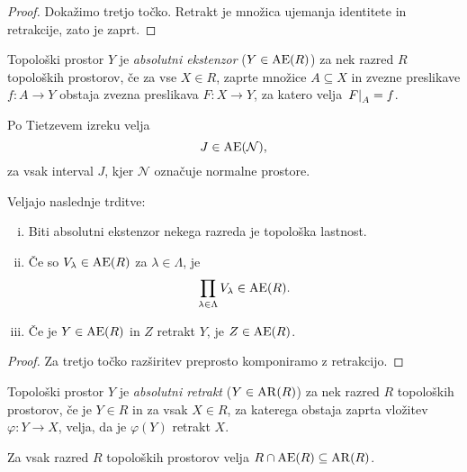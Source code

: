\begin{proof}
Dokažimo tretjo točko. Retrakt je množica ujemanja identitete in
retrakcije, zato je zaprt.
\end{proof}


\begin{definicija}
Topološki prostor $Y$ je
\emph{absolutni ekstenzor}
($Y \in \operatorname{AE}(R)$) za nek razred $R$ topoloških prostorov, če za vse
$X \in R$, zaprte množice $A \subseteq X$ in zvezne preslikave
$f \colon A \to Y$ obstaja zvezna preslikava $F \colon X \to Y$,
za katero velja $\left. F\right|_{A}^{} = f$.
\end{definicija}

\begin{opomba}
Po Tietzevem izreku velja
\[
J \in \operatorname{AE}(\mathcal{N}),
\]
za vsak interval $J$, kjer $\mathcal{N}$ označuje normalne
prostore.
\end{opomba}

\begin{trditev}
Veljajo naslednje trditve:

\begin{enumerate}[i)]
\item Biti absolutni ekstenzor nekega razreda je topološka
lastnost.
\item Če so $V_\lambda \in \operatorname{AE}(R)$ za $\lambda \in \Lambda$, je
\[
\prod_{\lambda \in \Lambda} V_\lambda \in \operatorname{AE}(R).
\]
\item Če je $Y \in \operatorname{AE}(R)$ in $Z$ retrakt $Y$, je $Z \in \operatorname{AE}(R)$.
\end{enumerate}
\end{trditev}

\begin{proof}
Za tretjo točko razširitev preprosto komponiramo z retrakcijo.
\end{proof}

\begin{definicija}
Topološki prostor $Y$ je
\emph{absolutni retrakt}
($Y \in \operatorname{AR}(R)$) za nek razred $R$ topoloških prostorov, če je
$Y \in R$ in za vsak $X \in R$, za katerega obstaja zaprta vložitev
$\varphi \colon Y \to X$, velja, da je $\varphi(Y)$ retrakt $X$.
\end{definicija}

\begin{trditev}
Za vsak razred $R$ topoloških prostorov velja
$R \cap \operatorname{AE}(R) \subseteq \operatorname{AR}(R)$.
\end{trditev}

